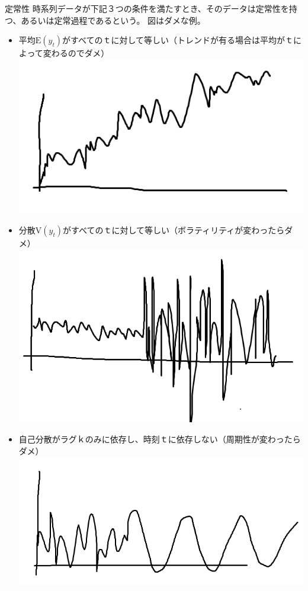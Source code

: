 \documentclass[dvipdfmx,autodetect-engine, unicode, 10pt, aspectratio=169]{beamer}
\begin{document}
\begin{frame}{定常性}
    時系列データが下記３つの条件を満たすとき、そのデータは定常性を持つ、あるいは定常過程であるという。
    図はダメな例。
    \begin{itemize}
        \item 平均$\text{E}(y_t)$がすべてのｔに対して等しい\footnotesize （トレンドが有る場合は平均がｔによって変わるのでダメ）\\
            \includegraphics[width=0.2\linewidth]{change_average.PNG}
        \item 分散$\text{V}(y_t)$がすべてのｔに対して等しい\footnotesize （ボラティリティが変わったらダメ）\\
            \includegraphics[width=0.2\linewidth]{varianve_change.PNG}
        \item 自己分散がラグｋのみに依存し、時刻ｔに依存しない\footnotesize （周期性が変わったらダメ）\\
            \includegraphics[width=0.2\linewidth]{change_periodic.PNG}
    \end{itemize}
    
\end{frame}
\end{document}
